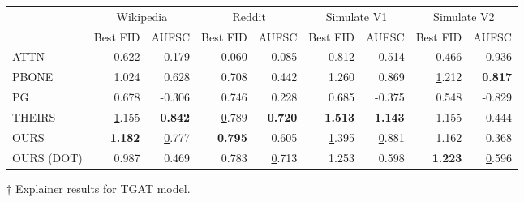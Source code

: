 \begin{tabular}{lrrrrrrrr}
\toprule
 & \multicolumn{2}{c}{Wikipedia} & \multicolumn{2}{c}{Reddit} & \multicolumn{2}{c}{Simulate V1} & \multicolumn{2}{c}{Simulate V2} \\
 & Best FID & AUFSC & Best FID & AUFSC & Best FID & AUFSC & Best FID & AUFSC \\
\midrule
ATTN & 0.622 & 0.179 & 0.060 & -0.085 & 0.812 & 0.514 & 0.466 & -0.936 \\
PBONE & 1.024 & 0.628 & 0.708 & 0.442 & 1.260 & 0.869 & \underline 1.212 & \bfseries 0.817 \\
PG & 0.678 & -0.306 & 0.746 & 0.228 & 0.685 & -0.375 & 0.548 & -0.829 \\
THEIRS & \underline 1.155 & \bfseries 0.842 & \underline 0.789 & \bfseries 0.720 & \bfseries 1.513 & \bfseries 1.143 & 1.155 & 0.444 \\
OURS & \bfseries 1.182 & \underline 0.777 & \bfseries 0.795 & 0.605 & \underline 1.395 & \underline 0.881 & 1.162 & 0.368 \\
OURS (DOT) & 0.987 & 0.469 & 0.783 & \underline 0.713 & 1.253 & 0.598 & \bfseries 1.223 & \underline 0.596 \\
\bottomrule
\end{tabular}
\caption{\label{tab:tgat_results}$\dagger$ Explainer results for TGAT model.}
